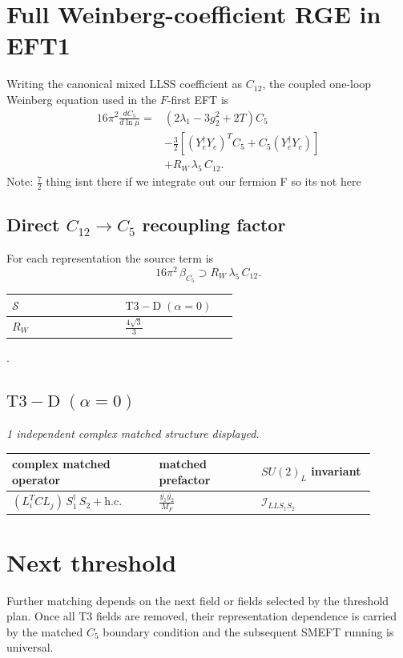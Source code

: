 \documentclass[9pt]{article}
\begin{document}
\section*{Full Weinberg-coefficient RGE in EFT1}
Writing the canonical mixed LLSS coefficient as $C_{12}$, the coupled one-loop Weinberg equation used in the $F$-first EFT is
\begin{align}
16\pi^2\frac{dC_5}{d\ln\mu}={}&(2\lambda_1-3g_2^2+2T)C_5\\
&-\frac32\left[(Y_e^\dagger Y_e)^T C_5+C_5(Y_e^\dagger Y_e)\right]\\
&+R_W\,\lambda_5\,C_{12}.
\end{align}
Note: $\frac{7}{2}$ thing isnt there if we integrate out our fermion F so its not here \subsection*{Direct $C_{12}\to C_5$ recoupling factor}
For each representation the source term is
\[16\pi^2\,\beta_{C_5}\supset R_W\,\lambda_5\,C_{12}.\]
\begin{longtable}{@{}p{0.37\linewidth}p{0.19\linewidth}@{}}
\toprule
$\mathcal{S}$ & $ \mathrm{T3-D}\;(\alpha=0) $ \\
\midrule
$R_W$ & $ \frac{4 \sqrt{3}}{3} $ \\
\bottomrule
\end{longtable}
.
\subsection*{$ \mathrm{T3-D}\;(\alpha=0) $}
\textit{1 independent complex matched structure displayed. }
\begin{longtable}{@{}p{0.36\linewidth}p{0.25\linewidth}p{0.29\linewidth}@{}}
\toprule
complex matched operator & matched prefactor & $SU(2)_L$ invariant \\
\midrule
$ (L_i^T C L_j)\,S_1^\dagger\,S_2+\mathrm{h.c.} $ & $ \frac{\overline{y_{1}} \overline{y_{2}}}{M_F} $ & $ \mathcal{I}_{LLS_1S_2} $ \\
\bottomrule
\end{longtable}
\section*{Next threshold}
Further matching depends on the next field or fields selected by the threshold plan.  Once all T3 fields are removed, their representation dependence is carried by the matched $C_5$ boundary condition and the subsequent SMEFT running is universal.
\end{document}

